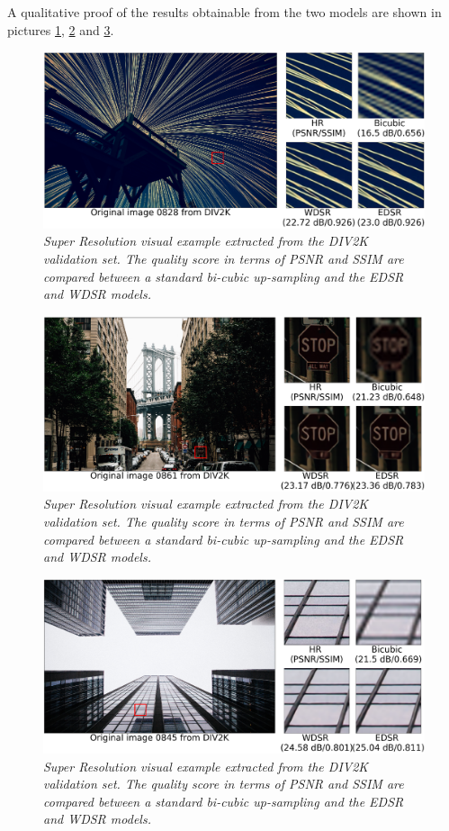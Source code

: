 \documentclass[12pt,a4paper]{report}
\begin{document}
A qualitative proof of the results obtainable from the two models are shown in pictures \ref{fig:sky}, \ref{fig:city} and \ref{fig:windows}.

\begin{figure}[h!]
  \includegraphics[scale=0.5]{images/sr_res1.png}
    \caption{\it Super Resolution visual example extracted from the DIV2K validation set. The quality score in terms of PSNR and SSIM are compared between a standard bi-cubic up-sampling and the EDSR and WDSR models.}
  \label{fig:sky}
\end{figure}

\begin{figure}[h!]
  \includegraphics[scale=0.5]{images/sr_res2.png}
    \caption{\it Super Resolution visual example extracted from the DIV2K validation set. The quality score in terms of PSNR and SSIM are compared between a standard bi-cubic up-sampling and the EDSR and WDSR models.}
  \label{fig:city}
\end{figure}

\begin{figure}[h]
  \includegraphics[scale=0.5]{images/sr_res3.png}
  \caption{\it Super Resolution visual example extracted from the DIV2K validation set. The quality score in terms of PSNR and SSIM are compared between a standard bi-cubic up-sampling and the EDSR and WDSR models.}
  \label{fig:windows}
\end{figure}
\end{document}
